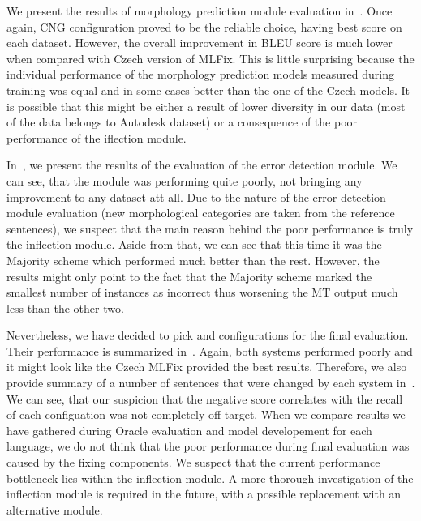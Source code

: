 We present the results of morphology prediction module evaluation in~.
Once again, CNG configuration proved to be the reliable choice, having best score on each dataset.
However, the overall improvement in BLEU score is much lower when compared with Czech version
of MLFix. This is little surprising because the individual performance of the morphology prediction
models measured during training was equal and in some cases better than the one of the Czech models.
It is possible that this might be either a result of lower diversity in our data (most of the data belongs
to Autodesk dataset) or a consequence of the poor performance of the iflection module.

In~, we present the results of the evaluation of the error detection module.
We can see, that the module was performing quite poorly, not bringing any improvement to any dataset att all. Due to the nature of the error detection module evaluation (new morphological categories are taken from the reference sentences), we suspect that the main reason behind the poor performance is truly the
inflection module. Aside from that, we can see that this time it was the Majority scheme which performed
 much better than the rest. However, the results might only point to the fact that the Majority scheme
 marked the smallest number of instances as incorrect thus worsening the MT output much less than the
 other two.

Nevertheless, we have decided to pick  and  configurations
for the final evaluation. Their performance is summarized in~. Again, both
systems performed poorly and it might look like the Czech MLFix provided the best results. Therefore,
we also provide summary of a number of sentences that were changed by each system in~.
We can see, that our suspicion that the negative score correlates with the recall of each configuation was not
completely off-target. When we compare results we have gathered during Oracle evaluation and model
developement for each language, we do not think that the poor performance during final evaluation was caused by the fixing
components. We suspect that the current performance bottleneck lies within the inflection module.
A more thorough investigation of the inflection module is required in the future, with a possible
replacement with an alternative module.

